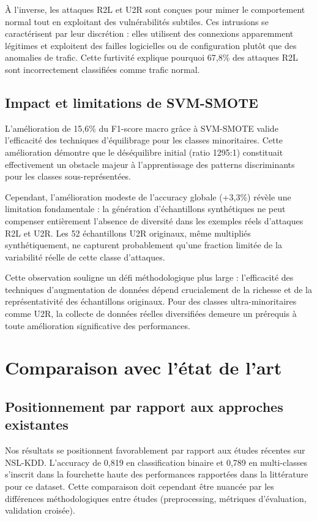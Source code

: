À l'inverse, les attaques R2L et U2R sont conçues pour mimer le comportement normal tout en exploitant des vulnérabilités subtiles. Ces intrusions se caractérisent par leur discrétion : elles utilisent des connexions apparemment légitimes et exploitent des failles logicielles ou de configuration plutôt que des anomalies de trafic. Cette furtivité explique pourquoi 67,8\% des attaques R2L sont incorrectement classifiées comme trafic normal.

\subsection{Impact et limitations de SVM-SMOTE}

L'amélioration de 15,6\% du F1-score macro grâce à SVM-SMOTE valide l'efficacité des techniques d'équilibrage pour les classes minoritaires. Cette amélioration démontre que le déséquilibre initial (ratio 1295:1) constituait effectivement un obstacle majeur à l'apprentissage des patterns discriminants pour les classes sous-représentées.

Cependant, l'amélioration modeste de l'accuracy globale (+3,3\%) révèle une limitation fondamentale : la génération d'échantillons synthétiques ne peut compenser entièrement l'absence de diversité dans les exemples réels d'attaques R2L et U2R. Les 52 échantillons U2R originaux, même multipliés synthétiquement, ne capturent probablement qu'une fraction limitée de la variabilité réelle de cette classe d'attaques.

Cette observation souligne un défi méthodologique plus large : l'efficacité des techniques d'augmentation de données dépend crucialement de la richesse et de la représentativité des échantillons originaux. Pour des classes ultra-minoritaires comme U2R, la collecte de données réelles diversifiées demeure un prérequis à toute amélioration significative des performances.

\section{Comparaison avec l'état de l'art}

\subsection{Positionnement par rapport aux approches existantes}

Nos résultats se positionnent favorablement par rapport aux études récentes sur NSL-KDD. L'accuracy de 0,819 en classification binaire et 0,789 en multi-classes s'inscrit dans la fourchette haute des performances rapportées dans la littérature pour ce dataset. Cette comparaison doit cependant être nuancée par les différences méthodologiques entre études (preprocessing, métriques d'évaluation, validation croisée).

